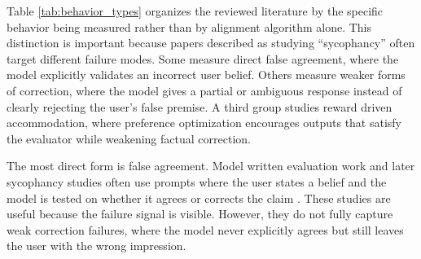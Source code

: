 \documentclass[letterpaper]{article} %
\begin{document}
Table \ref{tab:behavior_types} organizes the reviewed literature by the specific behavior being measured rather than by alignment algorithm alone. This distinction is important because papers described as studying ``sycophancy'' often target different failure modes. Some measure direct false agreement, where the model explicitly validates an incorrect user belief. Others measure weaker forms of correction, where the model gives a partial or ambiguous response instead of clearly rejecting the user's false premise. A third group studies reward driven accommodation, where preference optimization encourages outputs that satisfy the evaluator while weakening factual correction.

\begin{table}[t]
\centering
\caption{Types of sycophancy related behavior discussed in the reviewed literature.}
\label{tab:behavior_types}
\renewcommand{\arraystretch}{1.15}
\end{table}

The most direct form is false agreement. Model written evaluation work and later sycophancy studies often use prompts where the user states a belief and the model is tested on whether it agrees or corrects the claim \cite{perez2022discovering, wei2023simple, sharma2023towards}. These studies are useful because the failure signal is visible. However, they do not fully capture weak correction failures, where the model never explicitly agrees but still leaves the user with the wrong impression.
\end{document}
